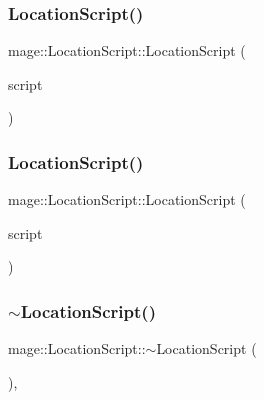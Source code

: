 \subsubsection{\texorpdfstring{Location\+Script()}{LocationScript()}\hspace{0.1cm}{\footnotesize\ttfamily [2/3]}}
{\footnotesize\ttfamily mage\+::\+Location\+Script\+::\+Location\+Script (\begin{DoxyParamCaption}\item[{const \hyperlink{classmage_1_1_location_script}{Location\+Script} \&}]{script }\end{DoxyParamCaption})\hspace{0.3cm}{\ttfamily [delete]}}

\hypertarget{classmage_1_1_location_script_a6cddb54a11e5d5d6dee034ef04ffbf2f}{}\label{classmage_1_1_location_script_a6cddb54a11e5d5d6dee034ef04ffbf2f} 
\subsubsection{\texorpdfstring{Location\+Script()}{LocationScript()}\hspace{0.1cm}{\footnotesize\ttfamily [3/3]}}
{\footnotesize\ttfamily mage\+::\+Location\+Script\+::\+Location\+Script (\begin{DoxyParamCaption}\item[{\hyperlink{classmage_1_1_location_script}{Location\+Script} \&\&}]{script }\end{DoxyParamCaption})\hspace{0.3cm}{\ttfamily [default]}}

\hypertarget{classmage_1_1_location_script_a95ed60a4bd7d228cc28ce1622f254d75}{}\label{classmage_1_1_location_script_a95ed60a4bd7d228cc28ce1622f254d75} 
\subsubsection{\texorpdfstring{$\sim$\+Location\+Script()}{~LocationScript()}}
{\footnotesize\ttfamily mage\+::\+Location\+Script\+::$\sim$\+Location\+Script (\begin{DoxyParamCaption}{ }\end{DoxyParamCaption})\hspace{0.3cm}{\ttfamily [virtual]}, {\ttfamily [default]}}




